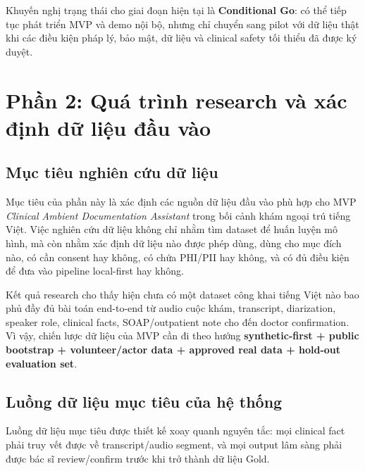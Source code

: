 \documentclass[12pt,a4paper]{article}
\begin{document}
Khuyến nghị trạng thái cho giai đoạn hiện tại là \textbf{Conditional Go}: có thể tiếp tục phát triển MVP và demo nội bộ, nhưng chỉ chuyển sang pilot với dữ liệu thật khi các điều kiện pháp lý, bảo mật, dữ liệu và clinical safety tối thiểu đã được ký duyệt.
\section{Phần 2: Quá trình research và xác định dữ liệu đầu vào}

\subsection{Mục tiêu nghiên cứu dữ liệu}

Mục tiêu của phần này là xác định các nguồn dữ liệu đầu vào phù hợp cho MVP \textit{Clinical Ambient Documentation Assistant} trong bối cảnh khám ngoại trú tiếng Việt. Việc nghiên cứu dữ liệu không chỉ nhằm tìm dataset để huấn luyện mô hình, mà còn nhằm xác định dữ liệu nào được phép dùng, dùng cho mục đích nào, có cần consent hay không, có chứa PHI/PII hay không, và có đủ điều kiện để đưa vào pipeline local-first hay không.

Kết quả research cho thấy hiện chưa có một dataset công khai tiếng Việt nào bao phủ đầy đủ bài toán end-to-end từ audio cuộc khám, transcript, diarization, speaker role, clinical facts, SOAP/outpatient note cho đến doctor confirmation. Vì vậy, chiến lược dữ liệu của MVP cần đi theo hướng \textbf{synthetic-first + public bootstrap + volunteer/actor data + approved real data + hold-out evaluation set}.

\subsection{Luồng dữ liệu mục tiêu của hệ thống}

Luồng dữ liệu mục tiêu được thiết kế xoay quanh nguyên tắc: mọi clinical fact phải truy vết được về transcript/audio segment, và mọi output lâm sàng phải được bác sĩ review/confirm trước khi trở thành dữ liệu Gold.
\end{document}
